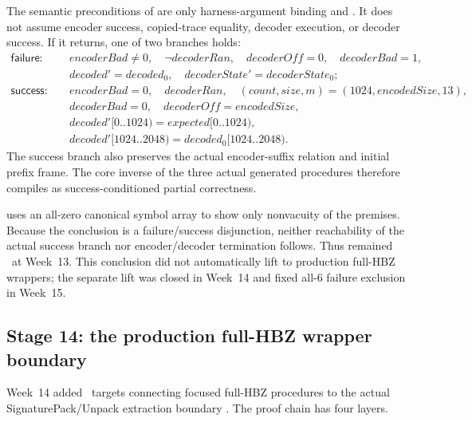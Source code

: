 \begin{verified}
The semantic preconditions of
 are only harness-argument
binding and .
It does not assume encoder success, copied-trace equality, decoder execution,
or decoder success. If it returns, one of two branches holds:
\[
\begin{aligned}
\mathsf{failure}:\quad
  &encoderBad\ne0,\quad \neg decoderRan,\quad decoderOff=0,\quad decoderBad=1,\\
  &decoded'=decoded_0,\quad decoderState'=decoderState_0;\\[0.3em]
\mathsf{success}:\quad
  &encoderBad=0,\quad decoderRan,\quad (count,size,m)=(1024,encodedSize,13),\\
  &decoderBad=0,\quad decoderOff=encodedSize,\\
  &decoded'[0..1024)=expected[0..1024),\\
  &decoded'[1024..2048)=decoded_0[1024..2048).
\end{aligned}
\]
The success branch also preserves the actual encoder-suffix relation and initial
prefix frame. The core inverse of the three actual generated procedures
therefore compiles as success-conditioned partial correctness.
\end{verified}

 uses an all-zero
canonical symbol array to show only nonvacuity of the premises.
Because the conclusion is a failure/success disjunction, neither reachability
of the actual success branch nor encoder/decoder termination follows.
Thus  remained \statuspartial\
at Week~13. This conclusion did not automatically lift to production full-HBZ
wrappers; the separate lift was closed in Week~14 and fixed all-6 failure
exclusion in Week~15.

\subsection{Stage 14: the production full-HBZ wrapper boundary}

Week~14 added \WeekFourteenTargetCount\ targets connecting focused full-HBZ
procedures to the actual SignaturePack/Unpack extraction boundary
\cite{week14-report,hbz-full-wrapper-composition}.
The proof chain has four layers.

